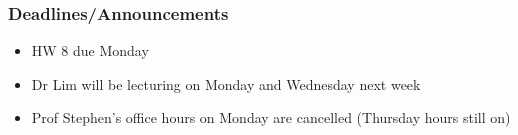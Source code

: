 
\begin{frame}
    \frametitle{Deadlines/Announcements}
\begin{itemize}
            \item HW 8 due Monday
            \item Dr Lim will be lecturing on Monday and Wednesday next week
            \item Prof Stephen's office hours on Monday are cancelled (Thursday hours still on)
        \end{itemize}
\end{frame}
